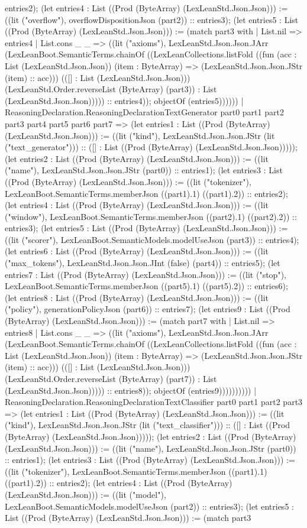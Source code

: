 \documentclass[11pt]{article}
\begin{document}
entries2); (let entries4 : List ((Prod (ByteArray) (LexLeanStd.Json.Json))) := ((lit ("overflow"), overflowDispositionJson (part2)) :: entries3); (let entries5 : List ((Prod (ByteArray) (LexLeanStd.Json.Json))) := (match part3 with | List.nil => entries4 | List.cons \_ \_ => ((lit ("axioms"), LexLeanStd.Json.Json.JArr (LexLeanBoot.SemanticTerms.chainOf ((LexLeanCollections.listFold ((fun (acc : List (LexLeanStd.Json.Json)) (item : ByteArray) => (LexLeanStd.Json.Json.JStr (item) :: acc))) (([] : List (LexLeanStd.Json.Json))) (LexLeanStd.Order.reverseList (ByteArray) (part3)) : List (LexLeanStd.Json.Json))))) :: entries4)); objectOf (entries5)))))) | ReasoningDeclaration.ReasoningDeclarationTextGenerator part0 part1 part2 part3 part4 part5 part6 part7 => (let entries1 : List ((Prod (ByteArray) (LexLeanStd.Json.Json))) := ((lit ("kind"), LexLeanStd.Json.Json.JStr (lit ("text\_generator"))) :: ([] : List ((Prod (ByteArray) (LexLeanStd.Json.Json))))); (let entries2 : List ((Prod (ByteArray) (LexLeanStd.Json.Json))) := ((lit ("name"), LexLeanStd.Json.Json.JStr (part0)) :: entries1); (let entries3 : List ((Prod (ByteArray) (LexLeanStd.Json.Json))) := ((lit ("tokenizer"), LexLeanBoot.SemanticTerms.memberJson ((part1).1) ((part1).2)) :: entries2); (let entries4 : List ((Prod (ByteArray) (LexLeanStd.Json.Json))) := ((lit ("window"), LexLeanBoot.SemanticTerms.memberJson ((part2).1) ((part2).2)) :: entries3); (let entries5 : List ((Prod (ByteArray) (LexLeanStd.Json.Json))) := ((lit ("scorer"), LexLeanBoot.SemanticModels.modelUseJson (part3)) :: entries4); (let entries6 : List ((Prod (ByteArray) (LexLeanStd.Json.Json))) := ((lit ("max\_tokens"), LexLeanStd.Json.Json.JInt (false) (part4)) :: entries5); (let entries7 : List ((Prod (ByteArray) (LexLeanStd.Json.Json))) := ((lit ("stop"), LexLeanBoot.SemanticTerms.memberJson ((part5).1) ((part5).2)) :: entries6); (let entries8 : List ((Prod (ByteArray) (LexLeanStd.Json.Json))) := ((lit ("policy"), generationPolicyJson (part6)) :: entries7); (let entries9 : List ((Prod (ByteArray) (LexLeanStd.Json.Json))) := (match part7 with | List.nil => entries8 | List.cons \_ \_ => ((lit ("axioms"), LexLeanStd.Json.Json.JArr (LexLeanBoot.SemanticTerms.chainOf ((LexLeanCollections.listFold ((fun (acc : List (LexLeanStd.Json.Json)) (item : ByteArray) => (LexLeanStd.Json.Json.JStr (item) :: acc))) (([] : List (LexLeanStd.Json.Json))) (LexLeanStd.Order.reverseList (ByteArray) (part7)) : List (LexLeanStd.Json.Json))))) :: entries8)); objectOf (entries9)))))))))) | ReasoningDeclaration.ReasoningDeclarationTextClassifier part0 part1 part2 part3 => (let entries1 : List ((Prod (ByteArray) (LexLeanStd.Json.Json))) := ((lit ("kind"), LexLeanStd.Json.Json.JStr (lit ("text\_classifier"))) :: ([] : List ((Prod (ByteArray) (LexLeanStd.Json.Json))))); (let entries2 : List ((Prod (ByteArray) (LexLeanStd.Json.Json))) := ((lit ("name"), LexLeanStd.Json.Json.JStr (part0)) :: entries1); (let entries3 : List ((Prod (ByteArray) (LexLeanStd.Json.Json))) := ((lit ("tokenizer"), LexLeanBoot.SemanticTerms.memberJson ((part1).1) ((part1).2)) :: entries2); (let entries4 : List ((Prod (ByteArray) (LexLeanStd.Json.Json))) := ((lit ("model"), LexLeanBoot.SemanticModels.modelUseJson (part2)) :: entries3); (let entries5 : List ((Prod (ByteArray) (LexLeanStd.Json.Json))) := (match part3 
\end{document}
